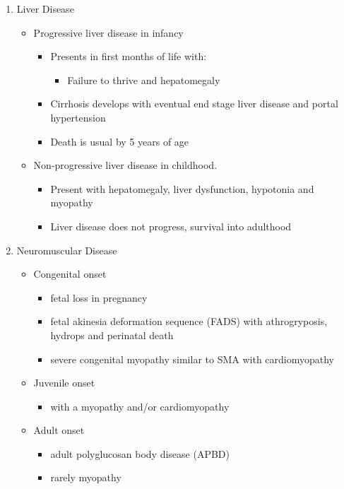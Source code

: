 \documentclass{scrartcl}
\begin{document}
\begin{enumerate}
\item Liver Disease
\label{sec:org23d1ee3}
\begin{itemize}
\item Progressive liver disease in infancy
\begin{itemize}
\item Presents in first months of life with:
\begin{itemize}
\item Failure to thrive and hepatomegaly
\end{itemize}
\item Cirrhosis develops with eventual end stage liver disease and
portal hypertension
\item Death is usual by 5 years of age
\end{itemize}
\item Non-progressive liver disease in childhood.
\begin{itemize}
\item Present with hepatomegaly, liver dysfunction, hypotonia and
myopathy
\item Liver disease does not progress, survival into adulthood
\end{itemize}
\end{itemize}

\item Neuromuscular Disease
\label{sec:orgfb25e2d}
\begin{itemize}
\item Congenital onset
\begin{itemize}
\item fetal loss in pregnancy
\item fetal akinesia deformation sequence (FADS) with athrogryposis, hydrops and perinatal death
\item severe congenital myopathy similar to SMA with \textpm{} cardiomyopathy
\end{itemize}
\item Juvenile onset
\begin{itemize}
\item with a myopathy and/or cardiomyopathy
\end{itemize}
\item Adult onset
\begin{itemize}
\item adult polyglucosan body disease (APBD)
\item rarely myopathy
\end{itemize}
\end{itemize}
\end{enumerate}
\end{document}
